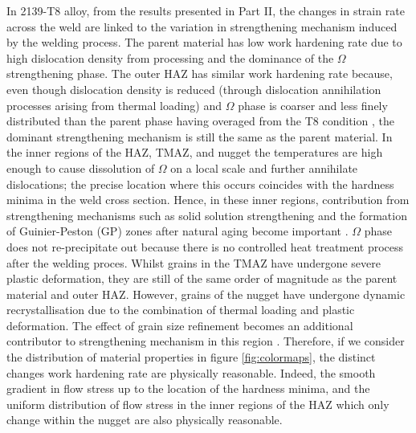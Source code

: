 In 2139-T8 alloy, from the results presented in Part II, the changes in strain rate across the weld are linked to the variation in strengthening mechanism induced by the welding process. The parent material has low work hardening rate due to high dislocation density from processing and the dominance of the $\Omega$ strengthening phase. The outer HAZ has similar work hardening rate because, even though dislocation density is reduced (through dislocation annihilation processes arising from thermal loading) and $\Omega$ phase is coarser and less finely distributed than the parent phase having overaged from the T8 condition \cite{Grujicic2010}, the dominant strengthening mechanism is still the same as the parent material. In the inner regions of the HAZ, TMAZ, and nugget the temperatures are high enough to cause dissolution of $\Omega$ on a local scale and further annihilate dislocations; the precise location where this occurs coincides with the hardness minima in the weld cross section. Hence, in these inner regions, contribution from strengthening mechanisms such as solid solution strengthening and the formation of Guinier-Peston (GP) zones after natural aging become important \cite{Grujicic2010,Cho2006,Bakavos2008}. $\Omega$ phase does not re-precipitate out because there is no controlled heat treatment process after the welding proces. Whilst grains in the TMAZ have undergone severe plastic deformation, they are still of the same order of magnitude as the parent material and outer HAZ. However, grains of the nugget have undergone dynamic recrystallisation due to the combination of thermal loading and plastic deformation. The effect of grain size refinement becomes an additional contributor to strengthening mechanism in this region \cite{Sato1999,Sato2001b}. Therefore, if we consider the distribution of material properties in figure \ref{fig:colormaps}, the distinct changes work hardening rate are physically reasonable. Indeed, the smooth gradient in flow stress up to the location of the hardness minima, and the uniform distribution of flow stress in the inner regions of the HAZ which only change within the nugget are also physically reasonable. 

